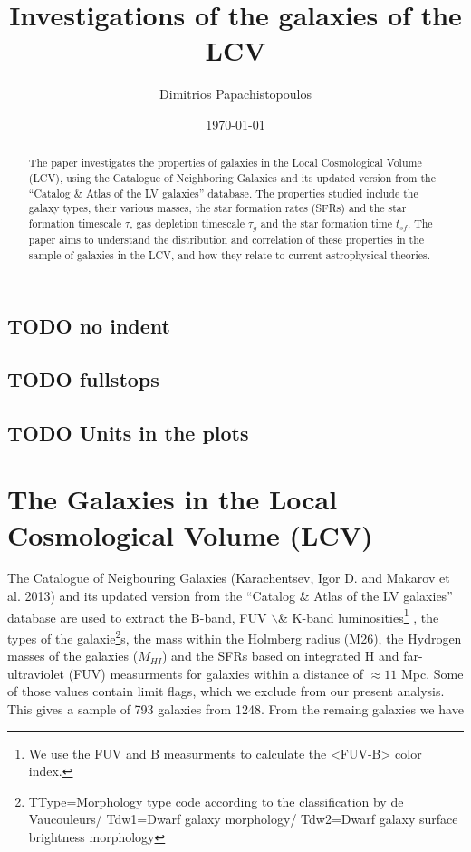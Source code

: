 \documentclass[a4paper,twocolumn]{article}
\author{Dimitrios Papachistopoulos}
\date{\today}
\title{Investigations of the galaxies of the LCV}
\begin{document}
\maketitle

\subsection{{\bfseries\sffamily TODO} no indent}
\label{sec:org2c76487}
\subsection{{\bfseries\sffamily TODO} fullstops}
\label{sec:org2eb98c4}
\subsection{{\bfseries\sffamily TODO} Units in the plots}
\label{sec:orge067e52}

\begin{abstract}
The paper investigates the properties of galaxies in the Local Cosmological Volume (LCV), using the Catalogue of Neighboring Galaxies\autocite{karachentsevUPDATEDNEARBYGALAXY2013} and its updated version from the ``Catalog \& Atlas of the LV galaxies'' database\autocite{CatalogLVGalaxies}. The properties studied include the galaxy types, their various masses, the star formation rates (SFRs) and the star formation timescale \(\tau\), gas depletion timescale \(\tau_g\) and the star formation time \(t_{sf}\). The paper aims to understand the distribution and correlation of these properties in the sample of galaxies in the LCV, and how they relate to current astrophysical theories.
\end{abstract}

\section{The Galaxies in the Local Cosmological Volume (LCV)}
\label{sec:orgdd9bb01}

The Catalogue of Neigbouring Galaxies (Karachentsev, Igor D. and Makarov  et al. 2013\autocite{karachentsevUPDATEDNEARBYGALAXY2013}) and its updated version from the ``Catalog \& Atlas of the LV galaxies'' database\autocite{CatalogLVGalaxies}  are used to extract the B-band, FUV $\backslash$& K-band luminosities\footnote{We use the FUV and B measurments to calculate the <FUV-B> color index.} , the types of the galaxie\footnote{TType=Morphology type code according to the classification by de Vaucouleurs/ Tdw1=Dwarf galaxy morphology/ Tdw2=Dwarf galaxy surface brightness morphology}s, the mass within the Holmberg radius (M26), the Hydrogen masses of the galaxies (\(M_{HI}\)) and the SFRs based on integrated  H and far-ultraviolet (FUV) measurments for galaxies within a distance of \(\approx 11\) Mpc. Some of those values contain limit flags, which we exclude from our present analysis. This gives a sample of 793 galaxies from 1248. From the remaing galaxies we have
\end{document}
